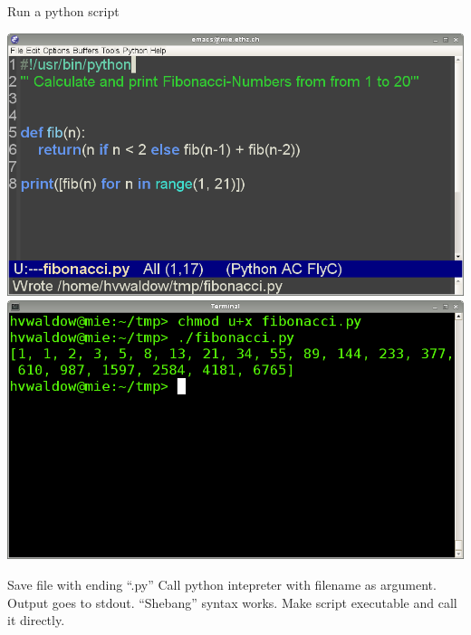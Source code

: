 \documentclass[xcolor=pdftex,dvipsnames,table]{beamer}
\begin{document}
\begin{frame}
\begin{block}{Run a python script}
\begin{overprint}
    \includegraphics[width=\textwidth]{runpy4.png}
    \includegraphics[width=\textwidth]{runpy5.png}
    \end{overprint}
    \begin{overprint}
       Save file with ending ``.py''
       Call python intepreter with filename as argument.
       Output goes to stdout.
       ``Shebang'' syntax works.
       Make script executable and call it directly.
    \end{overprint}
  \end{block}
\end{frame}
\end{document}
